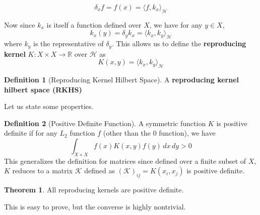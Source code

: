 \documentclass{article}
\theoremstyle{definition}
\newtheorem{theorem}{Theorem}[section]
\newtheorem{definition}{Definition}[section]
\begin{document}
  \[\delta_x f = f(x) = \langle f, k_x \rangle_{\mathcal{H}}\]

  Now since $k_x$ is itself a function defined over $X$, we have for any $y \in X$, 
  \[k_x (y) = \delta_y k_x = \langle k_x, k_y \rangle_{\mathcal{H}}\]
  where $k_y$ is the representative of $\delta_y$. This allows us to define the \textbf{reproducing kernel} $K: X \times X \rightarrow \mathbb{R}$ over $\mathcal{H}$ as 
  \[K(x, y) = \langle k_x, k_y \rangle_{\mathcal{H}}\]


  \begin{definition}[Reproducing Kernel Hilbert Space]
      A \textbf{reproducing kernel hilbert space (RKHS)}
  \end{definition}


  Let us state some properties. 

  \begin{definition}[Positive Definite Function]
    A symmetric function $K$ is positive definite if for any $L_2$ function $f$ (other than the $0$ function), we have 
    \[\int_{X \times X} f(x) K(x, y) f(y) \,dx \,dy > 0\]
    This generalizes the definition for matrices since defined over a finite subset of $X$, $K$ reduces to a matrix $\mathcal{K}$ defined as $(\mathcal{K})_{ij} = K(x_i, x_j)$ is positive definite. 
  \end{definition}

  \begin{theorem} 
   All reproducing kernels are positive definite.  
  \end{theorem} 

  This is easy to prove, but the converse is highly nontrivial. 
\end{document}
